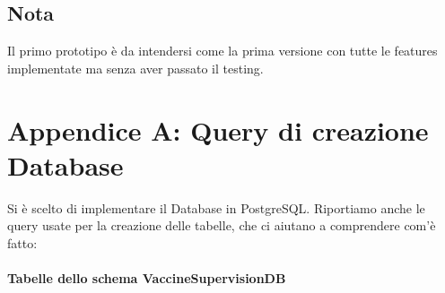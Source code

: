 \documentclass{article}
\begin{document}
    \subsection*{Nota}
        Il primo prototipo è da intendersi come la prima versione con tutte le features implementate ma senza aver passato il testing.

\newpage
    \section*{Appendice A: Query di creazione Database}

    Si è scelto di implementare il Database in PostgreSQL. Riportiamo anche le query usate per la creazione delle tabelle, che ci aiutano a comprendere com'è fatto:
    \paragraph*{Tabelle dello schema VaccineSupervisionDB}
\end{document}
